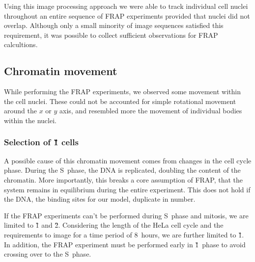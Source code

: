       Using this image processing approach we were able to track individual cell nuclei
      throughout an entire sequence of FRAP experiments  provided
      that nuclei did not overlap.
      Although only a small minority of image sequences satisfied this requirement,
      it was possible to collect sufficient observations for FRAP calcultions.

  \subsection{Chromatin movement}

    While performing the FRAP experiments, we observed some movement
    within the cell nuclei. These could not be accounted for simple rotational
    movement around the $x$ or $y$ axis, and resembled more the movement
    of individual bodies within the nuclei.

    \subsubsection{Selection of \G1{} cells}

      A possible cause of this chromatin movement comes from changes in
      the cell cycle phase. During the S~phase, the DNA is replicated,
      doubling the content of the chromatin.
      More importantly, this breaks
      a core assumption of FRAP, that the system remains in equilibrium
      during the entire experiment. This does not hold if the DNA, the
      binding sites for our model, duplicate in number.

      If the FRAP experiments can't be performed during S~phase and
      mitosis, we are limited to \G1{} and \G2{}. Considering
      the length of the HeLa cell cycle and the requirements to image
      for a time period of 8~hours, we are further limited to \G1{}.
      In addition, the FRAP experiment must be performed early in
      \G1{}~phase to avoid crossing over to the S~phase.


